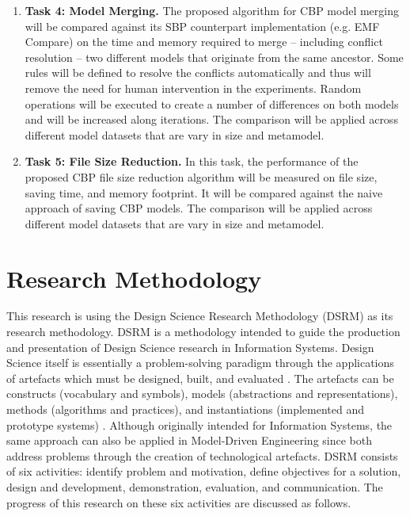 \documentclass[12pt, a4paper]{report} \usepackage[titletoc]{appendix}
\begin{document}
\begin{enumerate}
	\item \textbf{Task 4: Model Merging.} The proposed algorithm for CBP model merging will be compared against its SBP counterpart implementation (e.g. EMF Compare) on the time and memory required to merge -- including conflict resolution -- two different models that originate from the same ancestor. Some rules will be defined to resolve the conflicts automatically and thus will remove the need for human intervention in the experiments. Random operations will be executed to create a number of differences on both models and will be increased along iterations. The comparison will be applied across different model datasets that are vary in size and metamodel.   
	
	\item \textbf{Task 5: File Size Reduction.} In this task, the performance of the proposed CBP file size reduction algorithm  will be measured on file size, saving time, and memory footprint. It will be compared against the naive approach of saving CBP models. The comparison will be applied across different model datasets that are vary in size and metamodel.   
\end{enumerate}


\chapter{Research Methodology}
\label{ch:research_methodology}
This research is using the Design Science Research Methodology (DSRM) \cite{peffers2007design} as its research methodology. DSRM is a methodology intended to guide the production and presentation of Design Science research in Information Systems. Design Science itself is essentially a problem-solving paradigm through the applications of artefacts which must be designed, built, and evaluated \cite{hevner2010design}. The artefacts can be constructs (vocabulary and symbols), models (abstractions and representations), methods (algorithms and practices), and instantiations (implemented and prototype systems) \cite{hevner2004design}. Although originally intended for Information Systems, the same approach can also be applied in Model-Driven Engineering since both address problems through the creation of technological artefacts. DSRM consists of six activities: identify problem and motivation, define objectives for a solution, design and development, demonstration, evaluation, and communication. The progress of this research on these six activities are discussed as follows.
\end{document}
